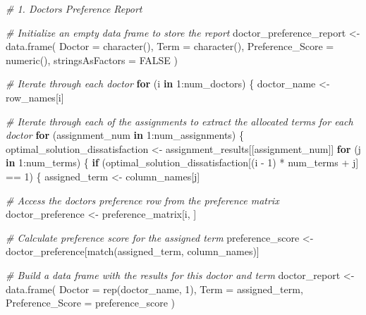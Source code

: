 \documentclass[
]{article}
\newenvironment{Shaded}{\begin{snugshade}}{\end{snugshade}}
\newcommand{\AttributeTok}[1]{\textcolor[rgb]{0.77,0.63,0.00}{#1}}
\newcommand{\CommentTok}[1]{\textcolor[rgb]{0.56,0.35,0.01}{\textit{#1}}}
\newcommand{\ConstantTok}[1]{\textcolor[rgb]{0.00,0.00,0.00}{#1}}
\newcommand{\ControlFlowTok}[1]{\textcolor[rgb]{0.13,0.29,0.53}{\textbf{#1}}}
\newcommand{\DecValTok}[1]{\textcolor[rgb]{0.00,0.00,0.81}{#1}}
\newcommand{\FunctionTok}[1]{\textcolor[rgb]{0.00,0.00,0.00}{#1}}
\newcommand{\NormalTok}[1]{#1}
\newcommand{\OtherTok}[1]{\textcolor[rgb]{0.56,0.35,0.01}{#1}}
\newcommand{\SpecialCharTok}[1]{\textcolor[rgb]{0.00,0.00,0.00}{#1}}
\begin{document}
\begin{Shaded}
\begin{Highlighting}[]
\CommentTok{\# 1. Doctors Preference Report}

\CommentTok{\# Initialize an empty data frame to store the report}
\NormalTok{doctor\_preference\_report }\OtherTok{\textless{}{-}} \FunctionTok{data.frame}\NormalTok{(}
  \AttributeTok{Doctor =} \FunctionTok{character}\NormalTok{(),}
  \AttributeTok{Term =} \FunctionTok{character}\NormalTok{(),}
  \AttributeTok{Preference\_Score =} \FunctionTok{numeric}\NormalTok{(),}
  \AttributeTok{stringsAsFactors =} \ConstantTok{FALSE}
\NormalTok{)}

\CommentTok{\# Iterate through each doctor}
\ControlFlowTok{for}\NormalTok{ (i }\ControlFlowTok{in} \DecValTok{1}\SpecialCharTok{:}\NormalTok{num\_doctors) \{}
\NormalTok{  doctor\_name }\OtherTok{\textless{}{-}}\NormalTok{ row\_names[i]}
  
  \CommentTok{\# Iterate through each of the assignments to extract the allocated terms for each doctor}
  \ControlFlowTok{for}\NormalTok{ (assignment\_num }\ControlFlowTok{in} \DecValTok{1}\SpecialCharTok{:}\NormalTok{num\_assignments) \{}
\NormalTok{    optimal\_solution\_dissatisfaction }\OtherTok{\textless{}{-}}\NormalTok{ assignment\_results[[assignment\_num]]}
    \ControlFlowTok{for}\NormalTok{ (j }\ControlFlowTok{in} \DecValTok{1}\SpecialCharTok{:}\NormalTok{num\_terms) \{}
      \ControlFlowTok{if}\NormalTok{ (optimal\_solution\_dissatisfaction[(i }\SpecialCharTok{{-}} \DecValTok{1}\NormalTok{) }\SpecialCharTok{*}\NormalTok{ num\_terms }\SpecialCharTok{+}\NormalTok{ j] }\SpecialCharTok{==} \DecValTok{1}\NormalTok{) \{}
\NormalTok{        assigned\_term }\OtherTok{\textless{}{-}}\NormalTok{ column\_names[j]}
        
        \CommentTok{\# Access the doctor\textquotesingle{}s preference row from the preference matrix}
\NormalTok{        doctor\_preference }\OtherTok{\textless{}{-}}\NormalTok{ preference\_matrix[i, ]}
        
        \CommentTok{\# Calculate preference score for the assigned term}
\NormalTok{        preference\_score }\OtherTok{\textless{}{-}}\NormalTok{ doctor\_preference[}\FunctionTok{match}\NormalTok{(assigned\_term, column\_names)]}
        
        \CommentTok{\# Build a data frame with the results for this doctor and term}
\NormalTok{        doctor\_report }\OtherTok{\textless{}{-}} \FunctionTok{data.frame}\NormalTok{(}
          \AttributeTok{Doctor =} \FunctionTok{rep}\NormalTok{(doctor\_name, }\DecValTok{1}\NormalTok{),}
          \AttributeTok{Term =}\NormalTok{ assigned\_term,}
          \AttributeTok{Preference\_Score =}\NormalTok{ preference\_score}
\NormalTok{        )}
        

\end{Highlighting}
\end{Shaded}
\end{document}
